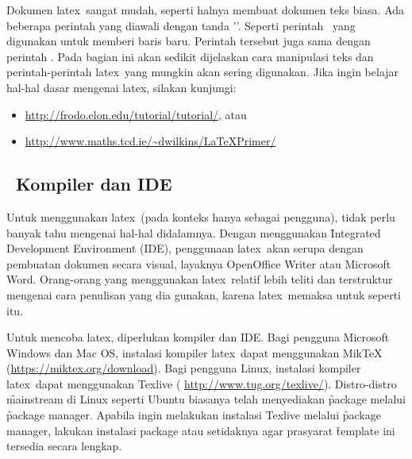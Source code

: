 \vspace*{0.2cm}

Dokumen \gls{latex}~sangat mudah, seperti halnya membuat dokumen teks biasa.
Ada beberapa perintah yang diawali dengan tanda '\bslash'.
Seperti perintah \code{\bslash\bslash}~yang digunakan untuk memberi baris baru.
Perintah tersebut juga sama dengan perintah .
Pada bagian ini akan sedikit dijelaskan cara manipulasi teks dan perintah-perintah \gls{latex}~yang mungkin akan sering digunakan.
Jika ingin belajar hal-hal dasar mengenai \gls{latex}, silakan kunjungi:

\begin{itemize}
	\item \url{http://frodo.elon.edu/tutorial/tutorial/}, atau
	\item \url{http://www.maths.tcd.ie/~dwilkins/LaTeXPrimer/}
\end{itemize}

\subsection{\latex~Kompiler dan IDE}
\label{sec:latexCompiler}
Untuk menggunakan \gls{latex}~(pada konteks hanya sebagai pengguna), tidak perlu banyak tahu mengenai hal-hal didalamnya.
Dengan menggunakan \f{Integrated Development Environment} (IDE), penggunaan \gls{latex}~akan serupa dengan pembuatan dokumen secara visual, layaknya OpenOffice Writer atau Microsoft Word.
Orang-orang yang menggunakan \gls{latex}~relatif lebih teliti dan terstruktur mengenai cara penulisan yang dia gunakan, karena \gls{latex}~memaksa untuk seperti itu.

Untuk mencoba \gls{latex}, diperlukan kompiler dan IDE.
Bagi pengguna Microsoft Windows dan Mac OS, instalasi kompiler \gls{latex}~dapat menggunakan MikTeX (\url{https://miktex.org/download}).
Bagi pengguna Linux, instalasi kompiler \gls{latex}~dapat menggunakan Texlive ( \url{http://www.tug.org/texlive/}).
Distro-distro \f{mainstream} di Linux seperti Ubuntu biasanya telah menyediakan \f{package}  melalui \f{package manager}.
Apabila ingin melakukan instalasi Texlive melalui \f{package manager}, lakukan instalasi package  atau setidaknya  agar prasyarat \f{template} ini tersedia secara lengkap.

